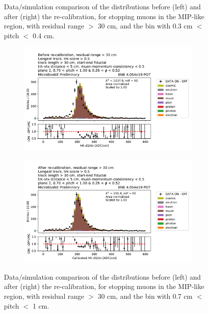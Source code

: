 \begin{figure}[H]
\begin{center}
\begin{subfigure}[b]{0.45\textwidth}
    \end{subfigure}
\caption{Data/simulation comparison of the \dqdx distributions before (left) and after (right) the re-calibration, for stopping muons in the MIP-like region, with residual range $>$ 30 cm, and the bin with 0.3 cm $<$ pitch $<$ 0.4 cm.}
\label{fig:stopping_muons_large_rr_low_pitch}
\end{center}
\end{figure}

\begin{figure}[H] 
\begin{center}
    \begin{subfigure}[b]{0.45\textwidth}
    \centering
    \includegraphics[width=1.00\textwidth]{stopping_muons_protons/070_pitch_100_026_phi_052apres.pdf}
    \end{subfigure}
    \begin{subfigure}[b]{0.45\textwidth}
    \centering
    \includegraphics[width=1.00\textwidth]{stopping_muons_protons/070_pitch_100_026_phi_052depois.pdf}
    \end{subfigure}
\caption{Data/simulation comparison of the \dqdx distributions before (left) and after (right) the re-calibration, for stopping muons in the MIP-like region, with residual range $>$ 30 cm, and the bin with 0.7 cm $<$ pitch $<$ 1 cm.}
\label{fig:stopping_muons_large_rr_high_pitch}
\end{center}
\end{figure}


